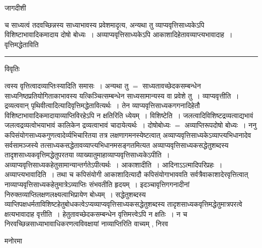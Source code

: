 \documentclass[10pt, openany]{book}
\begin{document}
{\newpage
\begin{center} जागदीशी \end{center}
{\la 
च साध्यत्वं तदवच्छिन्नस्य साध्याभावस्य प्रवेशमादृत्य, अन्यथा तु व्याप्यवृत्तिसाध्यकेऽपि विशिष्टाभावादिकमादाय दोषो बोध्यः~। अव्याप्यवृत्तिसाध्यकेऽपि आकाशादिहेतावव्याप्त्यभावादाह~। वृत्तिमद्धेताविति}\\
\hrule
\begin{center}     विवृतिः \end{center}
त्वस्य वृत्तित्वादव्याप्तिःस्यादिति समासः~। अन्यथा तु $=$ साध्यतावच्छेदकसम्बन्धेन साध्यनिष्ठप्रतियोगिताकाभावस्य यत्किञ्चित्सम्बन्धेन साध्यसामान्यस्य वा प्रवेशे तु~। व्याप्यवृत्तीति~। द्रव्यत्ववान् पृथिवीत्वादित्यादिवृत्तिमद्धेतावित्यर्थः~। तेन व्याप्यवृत्तिसाध्यकगगनादिहेतौ विशिष्टाभावादिकमादायाव्याप्तिविरहेऽपि न क्षतिरिति ध्येयम्~। विशिष्टेति~। जलत्वादिविशिष्टद्रव्यत्वाद्यभावं जलत्वद्रव्यत्वोभयाभावं कालिकेन द्रव्यत्वाभावं चादायेत्यर्थः~। दोषोबोध्यः $=$ अव्याप्तिरूपदोषो बोध्यः~। ननु कपिसंयोगसाध्यकगुणत्वादेर्व्यभिचारितया तत्र लक्षणागमनस्येष्टत्वात् अव्याप्यवृत्तिसाध्यकेऽव्याप्त्यभिधानादेव सर्वसामञ्जस्ये तत्साध्यकसद्धेतावव्याप्त्यभिधानमसङ्गतमित्यत
अव्याप्यवृत्तिसाध्यकसद्धेतुशब्दस्य तादृशसाध्यकवृत्तिमद्धेतुपरतया व्याख्यातुमाहाव्याप्यवृत्तिसाध्यकेऽपीति~। अव्याप्यवृत्तिसाध्यकहेतुसामान्यान्तर्गतेऽपीत्यर्थः~। आकाशादीति~। आदिनाऽऽत्मादिपरिप्रहः~। अव्याप्त्यभावादिति~। तथा च कपिसंयोगी आकाशादित्यादौ कपिसंयोगाभाववति सर्वत्रैवाकाशादेरवृत्तित्वात्
नाव्याप्यवृत्तिसाध्यकहेतुमात्रेऽव्याप्तिः संभवतीति हृदयम्~। इदञ्चावृत्तिगगनादीनां निरुक्तव्याप्तिलक्षणलक्ष्यत्वाभिप्रायेण बोध्यम्~। सद्धेतुशब्दस्य
व्याप्तिपक्षधर्मताविशिष्टहेतुबोधकत्वेऽप्यव्याप्यवृत्तिसाध्यकसद्धेतुशब्दस्य तादृशसाध्यकवृत्तिमद्धेतुमात्रपरत्वे क्षत्यभावादाह वृत्तीति~। हेतुतावच्छेदकसम्बन्धेन वृत्तिमत्त्वेऽपि न क्षतिः~। न च निरवच्छिन्नसाध्याभावाधिकरणत्वविवक्षायां नाव्याप्तिरिति वाच्यम् , निरव
\begin{center}   मनोरमा  \end{center}

}
\end{document}
